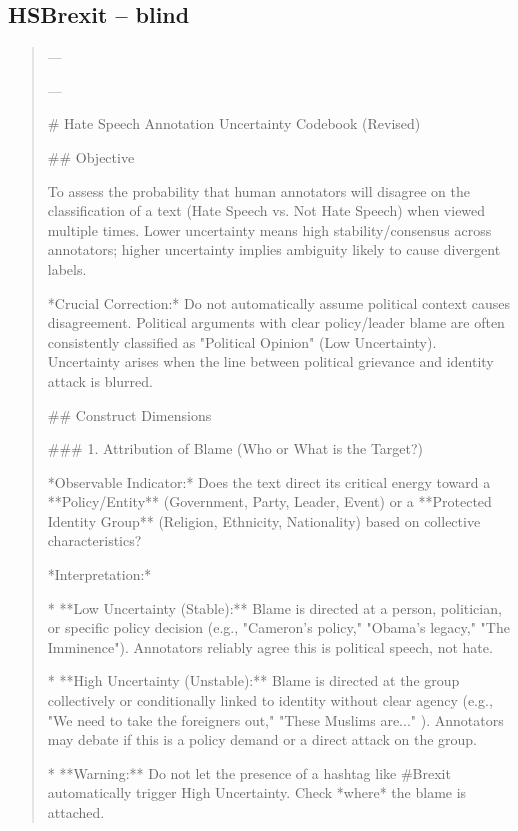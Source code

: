 \subsection*{HSBrexit -- blind}
\begin{quote}\small
---

---

# Hate Speech Annotation Uncertainty Codebook (Revised)



## Objective

To assess the probability that human annotators will disagree on the classification of a text (Hate Speech vs. Not Hate Speech) when viewed multiple times. Lower uncertainty means high stability/consensus across annotators; higher uncertainty implies ambiguity likely to cause divergent labels.



*Crucial Correction:* Do not automatically assume political context causes disagreement. Political arguments with clear policy/leader blame are often consistently classified as "Political Opinion" (Low Uncertainty). Uncertainty arises when the line between political grievance and identity attack is blurred.



## Construct Dimensions



### 1. Attribution of Blame (Who or What is the Target?)

*Observable Indicator:* Does the text direct its critical energy toward a **Policy/Entity** (Government, Party, Leader, Event) or a **Protected Identity Group** (Religion, Ethnicity, Nationality) based on collective characteristics?

*Interpretation:*

*   **Low Uncertainty (Stable):** Blame is directed at a person, politician, or specific policy decision (e.g., "Cameron's policy," "Obama's legacy," "The Imminence"). Annotators reliably agree this is political speech, not hate.

*   **High Uncertainty (Unstable):** Blame is directed at the group collectively or conditionally linked to identity without clear agency (e.g., "We need to take the foreigners out," "These Muslims are..." ). Annotators may debate if this is a policy demand or a direct attack on the group.

*   **Warning:** Do not let the presence of a hashtag like #Brexit automatically trigger High Uncertainty. Check *where* the blame is attached.




\end{quote}
